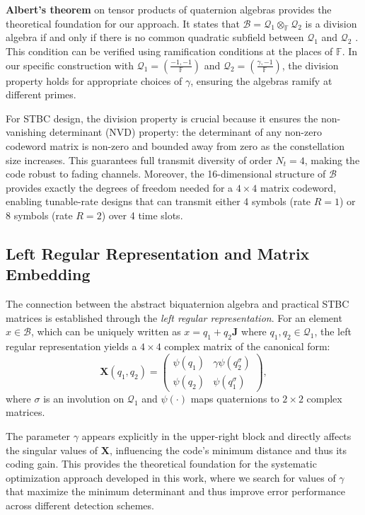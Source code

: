 \documentclass[twocolumn,conference]{IEEEtran}
\begin{document}
\textbf{Albert's theorem} on tensor products of quaternion algebras provides the theoretical foundation for our approach. It states that $\mathcal{B} = \mathcal{Q}_1 \otimes_{\mathbb{F}} \mathcal{Q}_2$ is a division algebra if and only if there is no common quadratic subfield between $\mathcal{Q}_1$ and $\mathcal{Q}_2$ \cite{3}. This condition can be verified using ramification conditions at the places of $\mathbb{F}$. In our specific construction with $\mathcal{Q}_1 = \left(\frac{-1, -1}{\mathbb{F}}\right)$ and $\mathcal{Q}_2 = \left(\frac{\gamma, -1}{\mathbb{F}}\right)$, the division property holds for appropriate choices of $\gamma$, ensuring the algebras ramify at different primes.

For STBC design, the division property is crucial because it ensures the non-vanishing determinant (NVD) property: the determinant of any non-zero codeword matrix is non-zero and bounded away from zero as the constellation size increases. This guarantees full transmit diversity of order $N_t = 4$, making the code robust to fading channels. Moreover, the 16-dimensional structure of $\mathcal{B}$ provides exactly the degrees of freedom needed for a $4 \times 4$ matrix codeword, enabling tunable-rate designs that can transmit either 4 symbols (rate $R=1$) or 8 symbols (rate $R=2$) over 4 time slots.

\subsection{Left Regular Representation and Matrix Embedding}

The connection between the abstract biquaternion algebra and practical STBC matrices is established through the \emph{left regular representation}. 
For an element $x \in \mathcal{B}$, which can be uniquely written as $x = q_1 + q_2 \mathbf{J}$ where $q_1, q_2 \in \mathcal{Q}_1$, the left regular representation yields a $4 \times 4$ complex matrix of the canonical form:
\begin{equation}
\mathbf{X}(q_1, q_2) = 
\begin{pmatrix}
\psi(q_1) & \gamma \psi(q_2^{\sigma}) \\
\psi(q_2) & \psi(q_1^{\sigma})
\end{pmatrix},
\end{equation}
where $\sigma$ is an involution on $\mathcal{Q}_1$ and $\psi(\cdot)$ maps quaternions to $2 \times 2$ complex matrices.

The parameter $\gamma$ appears explicitly in the upper-right block and directly affects the singular values of $\mathbf{X}$, influencing the code's minimum distance and thus its coding gain.
This provides the theoretical foundation for the systematic optimization approach developed in this work, where we search for values of $\gamma$ that maximize the minimum determinant and thus improve error performance across different detection schemes.
\end{document}
